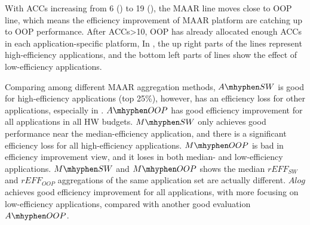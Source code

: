 


With ACCs increasing from 6 () to 19 (), the MAAR line moves close to OOP line, which means the efficiency improvement of MAAR platform are catching up to OOP performance. After ACCs>10, OOP has already allocated enough ACCs in each application-specific platform,  In , the up right parts of the lines represent high-efficiency applications, and the bottom left parts of lines show the effect of low-efficiency applications. 





Comparing among different MAAR aggregation methods, 
$A\mhyphen SW$ is good for high-efficiency applications (top 25\%), however, has an efficiency loss for other applications, especially in .
$A\mhyphen OOP$ has good efficiency improvement for all applications in all HW budgets.
$M\mhyphen SW$ only achieves good performance near the median-efficiency application, and there is a significant efficiency loss for all high-efficiency applications. 
$M\mhyphen OOP$ is bad in efficiency improvement view, and it loses in both median- and low-efficiency applications. 
$M\mhyphen SW$ and $M\mhyphen OOP$ shows the median $rEFF_{SW}$ and $rEFF_{OOP}$ aggregations of the same application set are actually different. 
$Alog$ achieves good efficiency improvement for all applications, with more focusing on low-efficiency applications, compared with another good evaluation $A\mhyphen OOP$.